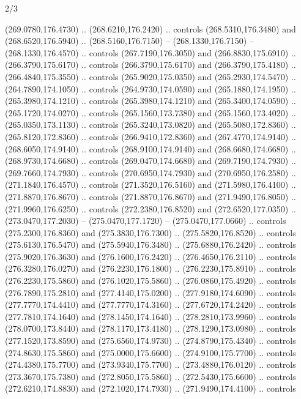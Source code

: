 \begin{flagdescription}{2/3}
\begin{scope}[xshift=0.5\flaglength,yshift=0.5\flagwidth,scale=\flagwidth/259.2]
\begin{scope}[y=0.8pt, x=0.8pt, yscale=-1,shift={(-243,-162)}]
      (269.0780,176.4730) .. (268.6210,176.2420) .. controls (268.5310,176.3480) and
      (268.6520,176.5940) .. (268.5160,176.7150) -- (268.1330,176.7150) --
      (268.1330,176.4570) .. controls (267.7190,176.3050) and (266.8830,175.6910) ..
      (266.3790,175.6170) .. controls (266.3790,175.6170) and (266.3790,175.4180) ..
      (266.4840,175.3550) .. controls (265.9020,175.0350) and (265.2930,174.5470) ..
      (264.7890,174.1050) .. controls (264.9730,174.0590) and (265.1880,174.1950) ..
      (265.3980,174.1210) .. controls (265.3980,174.1210) and (265.3400,174.0590) ..
      (265.1720,174.0270) .. controls (265.1560,173.7380) and (265.1560,173.4020) ..
      (265.0350,173.1130) .. controls (265.3240,173.0820) and (265.5080,172.8360) ..
      (265.8120,172.8360) .. controls (266.9410,172.8360) and (267.4770,174.9140) ..
      (268.6050,174.9140) .. controls (268.9100,174.9140) and (268.6680,174.6680) ..
      (268.9730,174.6680) .. controls (269.0470,174.6680) and (269.7190,174.7930) ..
      (269.7660,174.7930) .. controls (270.6950,174.7930) and (270.6950,176.2580) ..
      (271.1840,176.4570) .. controls (271.3520,176.5160) and (271.5980,176.4100) ..
      (271.8870,176.8670) .. controls (271.8870,176.8670) and (271.9490,176.8050) ..
      (271.9960,176.6250) .. controls (272.2380,176.8520) and (272.6520,177.0350) ..
      (273.0470,177.2030) -- (275.0470,177.1720) -- (275.0470,177.0660) .. controls
      (275.2300,176.8360) and (275.3830,176.7300) .. (275.5820,176.8520) .. controls
      (275.6130,176.5470) and (275.5940,176.3480) .. (275.6880,176.2420) .. controls
      (275.9020,176.3630) and (276.1600,176.2420) .. (276.4650,176.2110) .. controls
      (276.3280,176.0270) and (276.2230,176.1800) .. (276.2230,175.8910) .. controls
      (276.2230,175.5860) and (276.1020,175.5860) .. (276.0860,175.4920) .. controls
      (276.7890,175.2810) and (277.4140,175.0200) .. (277.9180,174.6090) .. controls
      (277.7770,174.4410) and (277.7770,174.3160) .. (277.6720,174.2420) .. controls
      (277.7810,174.1640) and (278.1450,174.1640) .. (278.2810,173.9960) .. controls
      (278.0700,173.8440) and (278.1170,173.4180) .. (278.1290,173.0980) .. controls
      (277.1520,173.8590) and (275.6560,174.9730) .. (274.8790,175.4340) .. controls
      (274.8630,175.5860) and (275.0000,175.6600) .. (274.9100,175.7700) .. controls
      (274.4380,175.7700) and (273.9340,175.7700) .. (273.4880,176.0120) .. controls
      (273.3670,175.7380) and (272.8050,175.5860) .. (272.5430,175.6600) .. controls
      (272.6210,174.8830) and (272.1020,174.7930) .. (271.9490,174.4100) .. controls

\end{scope}
\end{scope}
\end{flagdescription}
